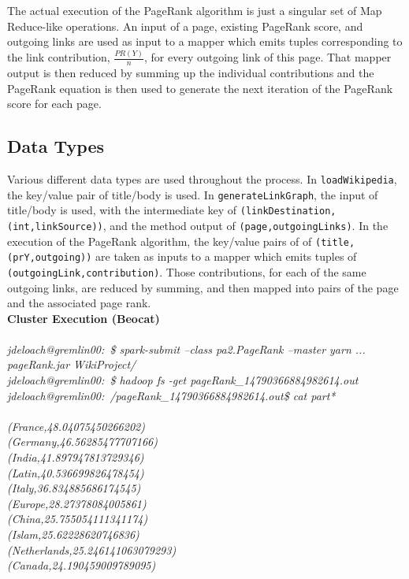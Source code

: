 \documentclass{article}
\begin{document}
The actual execution of the PageRank algorithm is just a singular set of Map Reduce-like operations.
An input of a page, existing PageRank score, and outgoing links are used as input to a mapper which emits tuples corresponding to the link contribution, $\frac{PR(Y)}{n}$, for every outgoing link of this page.
That mapper output is then reduced by summing up the individual contributions and the PageRank equation is then used to generate the next iteration of the PageRank score for each page.

\subsection{Data Types}
Various different data types are used throughout the process. In \texttt{loadWikipedia}, the key/value pair of title/body is used.
In \texttt{generateLinkGraph}, the input of title/body is used, with the intermediate key of \texttt{(linkDestination,(int,linkSource))}, and the method output of \texttt{(page,outgoingLinks)}.
In the execution of the PageRank algorithm, the key/value pairs of of \texttt{(title,(prY,outgoing))} are taken as inputs to a mapper which emits tuples of \texttt{(outgoingLink,contribution)}. Those contributions, for each of the same outgoing links, are reduced by summing, and then mapped into pairs of the page and the associated page rank. \\

\noindent
\textbf{Cluster Execution (Beocat)} \\ \\
\noindent
\textit{jdeloach@gremlin00:~\$ spark-submit --class pa2.PageRank --master yarn ... pageRank.jar WikiProject/ \\
jdeloach@gremlin00:~\$ hadoop fs -get pageRank\_14790366884982614.out \\
jdeloach@gremlin00:~/pageRank\_14790366884982614.out\$ cat part* \\ \\
(France,48.04075450266202) \\
(Germany,46.56285477707166) \\
(India,41.897947813729346) \\
(Latin,40.536699826478454) \\
(Italy,36.834885686174545) \\
(Europe,28.27378084005861) \\
(China,25.755054111341174) \\
(Islam,25.62228620746836) \\
(Netherlands,25.246141063079293) \\
(Canada,24.190459009789095)} \\
\end{document}
